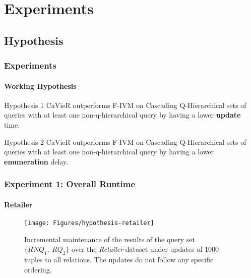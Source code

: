 \documentclass[
	11pt, %
]{beamer}
\begin{document}
\section{Experiments}
\subsection{Hypothesis}
\begin{frame}
	\frametitle{Experiments}
	\framesubtitle{Working Hypothesis}
	\begin{block}{Hypothesis 1 }\label{hyp:initialUpdate}
		CaVieR outperforms F-IVM on Cascading Q-Hierarchical sets of queries with at least one non-q-hierarchical query by having a lower \textbf{update} time.
	\end{block}
	
	\begin{block}{Hypothesis 2}\label{hyp:initialEnumeration}
		CaVieR outperforms F-IVM on Cascading Q-Hierarchical sets of queries with at least one non-q-hierarchical query by having a lower \textbf{enumeration} delay.
	\end{block}

\end{frame}




\begin{frame}
	\frametitle{Experiment 1: Overall Runtime}
	\framesubtitle{Retailer}
	\begin{figure}
		\begin{minipage}{0.25\textwidth}
		\end{minipage}
		\begin{minipage}{0.74\textwidth}
			\texttt{[image: Figures/hypothesis-retailer]} %
		\end{minipage}
		\caption{Incremental maintenance of the results of the query set $\{RNQ_1,\ RQ_2\}$ over the {\em Retailer} dataset under updates of 1000 tuples to all relations. The updates do not follow any specific ordering. }
	\end{figure}
\end{frame}
\end{document}
